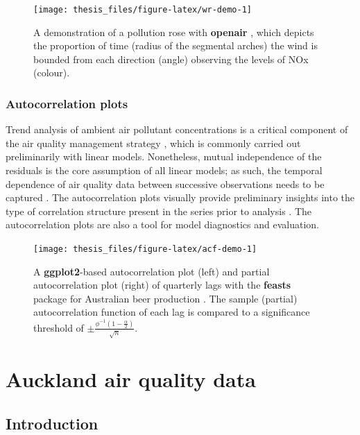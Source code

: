 \documentclass{aucklandthesis}
\begin{document}
\begin{figure}
\texttt{[image: thesis\_files/figure-latex/wr-demo-1]} \caption{A demonstration of a pollution rose with \textbf{openair} \autocite{openair}, which depicts the proportion of time (radius of the segmental arches) the wind is bounded from each direction (angle) observing the levels of NOx (colour).}\label{fig:wr-demo}
\end{figure}



\hypertarget{autocorrelation-plots}{%
\subsection{Autocorrelation plots}\label{autocorrelation-plots}}

Trend analysis of ambient air pollutant concentrations is a critical component of the air quality management strategy \autocite{aqi}, which is commonly carried out preliminarily with linear models. Nonetheless, mutual independence of the residuals is the core assumption of all linear models; as such, the temporal dependence of air quality data between successive observations needs to be captured \autocite{lm}. The autocorrelation plots visually provide preliminary insights into the type of correlation structure present in the series prior to analysis \autocite{acf}. The autocorrelation plots are also a tool for model diagnostics and evaluation.

\begin{figure}
\texttt{[image: thesis\_files/figure-latex/acf-demo-1]} \caption{A \textbf{ggplot2}-based autocorrelation plot (left) and partial autocorrelation plot (right) of quarterly lags with the \textbf{feasts} package \autocite{feasts} for Australian beer production \autocite{fpp3d}. The sample (partial) autocorrelation function of each lag is compared to a significance threshold of \(\pm \frac{\phi^{-1} (1 - \frac{\alpha}{2})}{\sqrt{n}}\).}\label{fig:acf-demo}
\end{figure}



\hypertarget{ch:data}{%
\chapter{Auckland air quality data}\label{ch:data}}

\hypertarget{introduction}{%
\section{Introduction}\label{introduction}}
\end{document}
